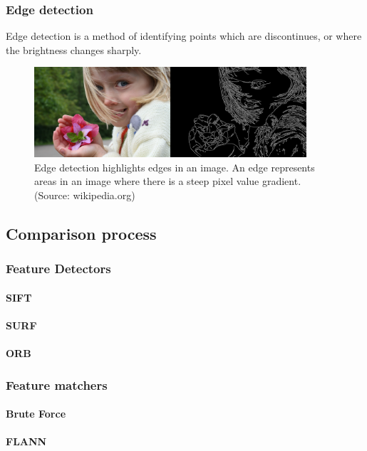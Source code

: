 \documentclass[11pt,a4paper]{report}
\begin{document}
			\subsubsection{Edge detection}
				Edge detection is a method of identifying points which are discontinues, or where the brightness changes sharply.
				\begin{figure}[H]
					\centering
					\includegraphics[width=0.9\textwidth]{edge_detection}
					\caption[Edge detection]{Edge detection highlights edges in an image. An edge represents areas in an image where there is a steep pixel value gradient. (Source: wikipedia.org)}
					\label{fig:edge_detection}
				\end{figure}
		
		\subsection{Comparison process}
			\subsubsection{Feature Detectors}
				\paragraph{SIFT}
				\paragraph{SURF}
				\paragraph{ORB}
			\subsubsection{Feature matchers}
				\paragraph{Brute Force}
				\paragraph{FLANN}
\end{document}
